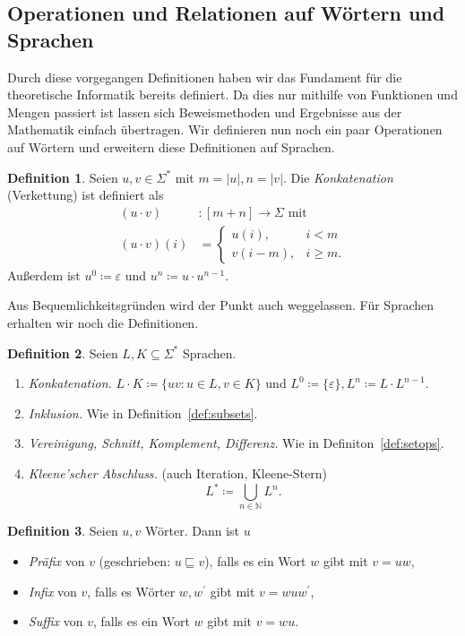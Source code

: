\documentclass[11pt, a4paper]{article}
\theoremstyle{definition}
\newtheorem{definition}{Definition}[section]
\theoremstyle{plain}
\numberwithin{equation}{section}
\begin{document}
\subsection{Operationen und Relationen auf Wörtern und Sprachen}\label{sec:awl_wordops}
Durch diese vorgegangen Definitionen haben wir das Fundament für die theoretische Informatik bereits definiert. Da dies nur mithilfe von Funktionen und Mengen  passiert ist lassen sich Beweismethoden und Ergebnisse aus der Mathematik einfach übertragen. Wir definieren nun noch ein paar Operationen auf Wörtern und erweitern diese Definitionen auf Sprachen.
\begin{definition}
	Seien \( u, v \in \Sigma^\ast \) mit \( m = \left| u \right|, n = \left| v \right| \). Die \textit{Konkatenation} (Verkettung) ist definiert als
	\begin{align*}
		(u \cdot v)&\colon [m{+}n] \to \Sigma \text{ mit}\\
		(u \cdot v)(i) &= \left\lbrace \begin{array}{ll}u(i), & i < m\\ v(i-m), & i \geq m. \end{array} \right.
	\end{align*}
	Außerdem ist \( u^0 \coloneqq \varepsilon \) und \( u^n \coloneqq u \cdot u^{n-1} \).
\end{definition}
Aus Bequemlichkeitsgründen wird der Punkt auch weggelassen. Für Sprachen erhalten wir noch die Definitionen.
\begin{definition}
	Seien \( L, K \subseteq \Sigma^\ast \) Sprachen.
	\begin{enumerate}
		\item \textit{Konkatenation.} \( L \cdot K \coloneqq \{ uv : u \in L, v \in K \} \) und \( L^0 \coloneqq \{ \varepsilon \}, L^n \coloneqq L \cdot L^{n-1} \).
		\item \textit{Inklusion.} Wie in Definition~\ref{def:subsets}.
		\item \textit{Vereinigung, Schnitt, Komplement, Differenz.} Wie in Definiton~\ref{def:setops}.
		\item \textit{Kleene'scher Abschluss.} (auch Iteration, Kleene-Stern)
			\[
				L^\ast \coloneqq \bigcup_{n \in \mathbb{N}} L^n.
			\]
	\end{enumerate}
\end{definition}
\begin{definition}
	Seien \( u, v \) Wörter. Dann ist \( u \)
	\begin{itemize}
		\item \textit{Präfix} von \( v \) (geschrieben: \( u \sqsubseteq v \)), falls es ein Wort \( w \) gibt mit \( v = uw \),
		\item \textit{Infix} von \( v \), falls es Wörter \( w, w^\prime \) gibt mit \( v = wuw^\prime \),
		\item \textit{Suffix} von \( v \), falls es ein Wort \( w \) gibt mit \( v = wu \).
	\end{itemize}
\end{definition}
\end{document}
